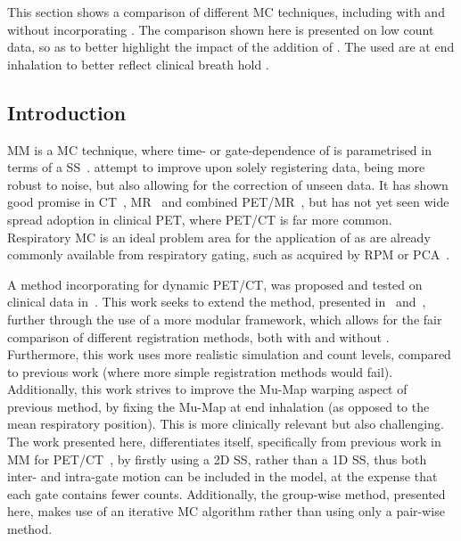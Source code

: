         This section shows a comparison of different \gls{MC} techniques, including with and without incorporating . The comparison shown here is presented on low count data, so as to better highlight the impact of the addition of . The  used are at end inhalation to better reflect clinical breath hold .
        
        \subsection{Introduction} \label{sec:comparison_of_motion_correction_methods_incorporating_motion_modelling_for_pet/ct_using_a_single_breath_hold_attenuation_map_introduction}
            \gls{MM} is a \gls{MC} technique, where time- or gate-dependence of  is parametrised in terms of a \gls{SS}~.  attempt to improve upon solely registering data, being more robust to noise, but also allowing for the correction of unseen data. It has shown good promise in \gls{CT}~, \gls{MR}~ and combined \gls{PET}/\gls{MR}~, but has not yet seen wide spread adoption in clinical \gls{PET}, where \gls{PET}/\gls{CT} is far more common. Respiratory \gls{MC} is an ideal problem area for the application of  as  are already commonly available from respiratory gating, such as acquired by \gls{RPM} or \gls{PCA}~.
            
            A method incorporating  for dynamic \gls{PET}/\gls{CT}, was proposed and tested on clinical data in~. This work seeks to extend the method, presented in~ and~, further through the use of a more modular framework, which allows for the fair comparison of different registration methods, both with and without . Furthermore, this work uses more realistic simulation and count levels, compared to previous work (where more simple registration methods would fail). Additionally, this work strives to improve the \gls{Mu-Map} warping aspect of previous method, by fixing the \gls{Mu-Map} at end inhalation (as opposed to the mean respiratory position). This is more clinically relevant but also challenging. The work presented here, differentiates itself, specifically from previous work in \gls{MM} for \gls{PET}/\gls{CT}~, by firstly using a \gls{2D} \gls{SS}, rather than a \gls{1D} \gls{SS}, thus both inter- and intra-gate motion can be included in the model, at the expense that each gate contains fewer counts. Additionally, the group-wise method, presented here, makes use of an iterative \gls{MC} algorithm rather than using only a pair-wise method.
        
